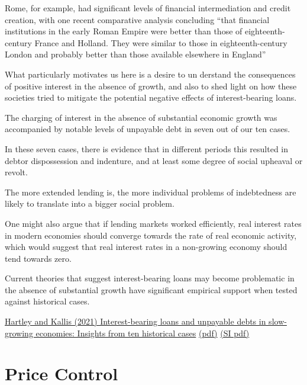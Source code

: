 \documentclass[
]{book}
\begin{document}
Rome,
for example, had significant levels of financial intermediation and credit
creation, with one recent comparative analysis concluding ``that financial
institutions in the early Roman Empire were better than those of
eighteenth- century France and Holland. They were similar to those in
eighteenth-century London and probably better than those available
elsewhere in England''

What particularly motivates us here is a desire to un­
derstand the consequences of positive interest in the absence of growth,
and also to shed light on how these societies tried to mitigate the
potential negative effects of interest-bearing loans.

The charging of interest in the absence
of substantial economic growth was accompanied by notable levels of
unpayable debt in seven out of our ten cases.

In these seven
cases, there is evidence that in different periods this resulted in debtor
dispossession and indenture, and at least some degree of social upheaval
or revolt.

The more extended lending is, the more individual problems of
indebtedness are likely to translate into a bigger social problem.

One might also argue
that if lending markets worked efficiently, real interest rates in modern
economies should converge towards the rate of real economic activity,
which would suggest that real interest rates in a non-growing economy
should tend towards zero.

Current theories that
suggest interest-bearing loans may become problematic in the absence
of substantial growth have significant empirical support when tested
against historical cases.

\href{https://www.sciencedirect.com/science/article/pii/S0921800921001907}{Hartley and Kallis (2021) Interest-bearing loans and unpayable debts in slow-growing economies: Insights from ten historical cases}
\href{pdf/Hartley_Kallis_2021_Unpayable_debt.pdf}{(pdf)}
\href{pdf/Hartley_Kallis_2021_Unpayable_debt_SI.pdf}{(SI pdf)}

\hypertarget{price-control}{%
\chapter{Price Control}\label{price-control}}
\end{document}
